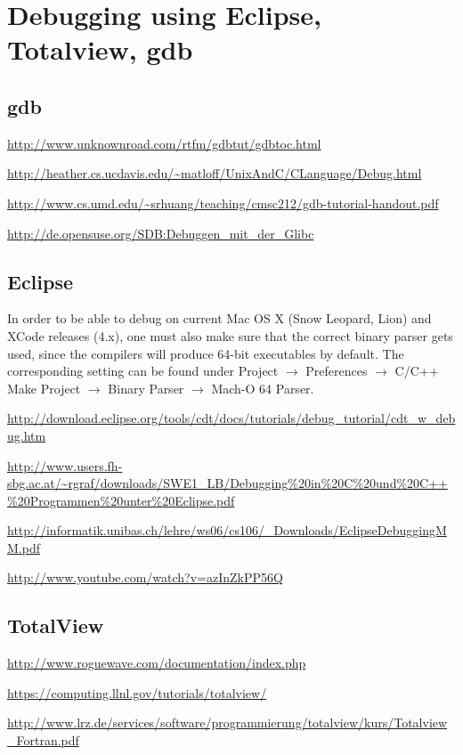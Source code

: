 
\chapter{Debugging using Eclipse, Totalview, gdb}

\section{gdb}
\url{http://www.unknownroad.com/rtfm/gdbtut/gdbtoc.html}

\url{http://heather.cs.ucdavis.edu/~matloff/UnixAndC/CLanguage/Debug.html}

\url{http://www.cs.umd.edu/~srhuang/teaching/cmsc212/gdb-tutorial-handout.pdf}

\url{http://de.opensuse.org/SDB:Debuggen_mit_der_Glibc}

\section{Eclipse}

In order  to be able  to debug on  current Mac OS  X (Snow Leopard,  Lion) and
XCode releases (4.x),  one must also make sure that  the correct binary parser
gets used, since the compilers will produce 64-bit executables by default. The
corresponding  setting can  be found  under Project  $\rightarrow$ Preferences
$\rightarrow$  C/C++ Make  Project $\rightarrow$  Binary  Parser $\rightarrow$
Mach-O 64 Parser.

\url{http://download.eclipse.org/tools/cdt/docs/tutorials/debug_tutorial/cdt_w_debug.htm}

\url{http://www.users.fh-sbg.ac.at/~rgraf/downloads/SWE1_LB/Debugging%20in%20C%20und%20C++%20Programmen%20unter%20Eclipse.pdf}

\url{http://informatik.unibas.ch/lehre/ws06/cs106/_Downloads/EclipseDebuggingMM.pdf}

\url{http://www.youtube.com/watch?v=azInZkPP56Q}

\section{TotalView}
\url{http://www.roguewave.com/documentation/index.php}

\url{https://computing.llnl.gov/tutorials/totalview/}

\url{http://www.lrz.de/services/software/programmierung/totalview/kurs/Totalview_Fortran.pdf}

